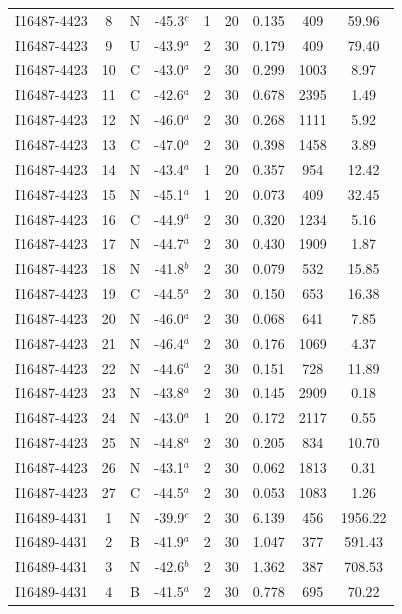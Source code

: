 \begin{table}
\begin{tabular}{ccccccccc}
I16487-4423 & 8 & N & -45.3$^{c}$ & 1 & 20 & 0.135 & 409 & 59.96 \\
I16487-4423 & 9 & U & -43.9$^{a}$ & 2 & 30 & 0.179 & 409 & 79.40 \\
I16487-4423 & 10 & C & -43.0$^{a}$ & 2 & 30 & 0.299 & 1003 & 8.97 \\
I16487-4423 & 11 & C & -42.6$^{a}$ & 2 & 30 & 0.678 & 2395 & 1.49 \\
I16487-4423 & 12 & N & -46.0$^{a}$ & 2 & 30 & 0.268 & 1111 & 5.92 \\
I16487-4423 & 13 & C & -47.0$^{a}$ & 2 & 30 & 0.398 & 1458 & 3.89 \\
I16487-4423 & 14 & N & -43.4$^{a}$ & 1 & 20 & 0.357 & 954 & 12.42 \\
I16487-4423 & 15 & N & -45.1$^{a}$ & 1 & 20 & 0.073 & 409 & 32.45 \\
I16487-4423 & 16 & C & -44.9$^{a}$ & 2 & 30 & 0.320 & 1234 & 5.16 \\
I16487-4423 & 17 & N & -44.7$^{a}$ & 2 & 30 & 0.430 & 1909 & 1.87 \\
I16487-4423 & 18 & N & -41.8$^{b}$ & 2 & 30 & 0.079 & 532 & 15.85 \\
I16487-4423 & 19 & C & -44.5$^{a}$ & 2 & 30 & 0.150 & 653 & 16.38 \\
I16487-4423 & 20 & N & -46.0$^{a}$ & 2 & 30 & 0.068 & 641 & 7.85 \\
I16487-4423 & 21 & N & -46.4$^{a}$ & 2 & 30 & 0.176 & 1069 & 4.37 \\
I16487-4423 & 22 & N & -44.6$^{a}$ & 2 & 30 & 0.151 & 728 & 11.89 \\
I16487-4423 & 23 & N & -43.8$^{a}$ & 2 & 30 & 0.145 & 2909 & 0.18 \\
I16487-4423 & 24 & N & -43.0$^{a}$ & 1 & 20 & 0.172 & 2117 & 0.55 \\
I16487-4423 & 25 & N & -44.8$^{a}$ & 2 & 30 & 0.205 & 834 & 10.70 \\
I16487-4423 & 26 & N & -43.1$^{a}$ & 2 & 30 & 0.062 & 1813 & 0.31 \\
I16487-4423 & 27 & C & -44.5$^{a}$ & 2 & 30 & 0.053 & 1083 & 1.26 \\
I16489-4431 & 1 & N & -39.9$^{c}$ & 2 & 30 & 6.139 & 456 & 1956.22 \\
I16489-4431 & 2 & B & -41.9$^{a}$ & 2 & 30 & 1.047 & 377 & 591.43 \\
I16489-4431 & 3 & N & -42.6$^{b}$ & 2 & 30 & 1.362 & 387 & 708.53 \\
I16489-4431 & 4 & B & -41.5$^{a}$ & 2 & 30 & 0.778 & 695 & 70.22 \\

\end{tabular}
\end{table}
